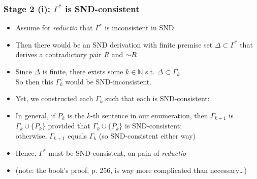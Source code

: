 \begin{frame}
\frametitle{Stage 2 (i): $\Gamma^{\ast}$ is SND-consistent}

\begin{itemize}[<+->]

\item Assume for \textit{reductio} that $\Gamma^{\ast}$ is inconsistent in SND

\item Then there would be an SND derivation with finite premise set $\Delta \subset \Gamma^{\ast}$ that derives a contradictory pair $R$ and $\enot R$

\item Since $\Delta$ is finite, there exists some $k \in \mathbb{N}$ s.t. $\Delta \subset \Gamma_k$. \\ So then this $\Gamma_k$ would be \textcolor{OGlyallpink}{SND-inconsistent}. 

\item Yet, we constructed each $\Gamma_k$ such that each is \alert{SND-consistent}: 

\bi

\item In general, if $P_k$ is the $k$-th sentence in our enumeration, then $\Gamma_{k+1}$ is $\Gamma_k \cup \{P_k\}$ provided that $\Gamma_k \cup \{P_k\}$ is SND-consistent; \\ otherwise, $\Gamma_{k+1}$ equals $\Gamma_k$ (so SND-consistent either way)

\ei

\item Hence, $\Gamma^{\ast}$ must be SND-consistent, on pain of \textit{reductio} 

\item \footnotesize{(note: the book's proof, p. 256, is way more complicated than necessary\dots)}

\end{itemize}
\end{frame}


